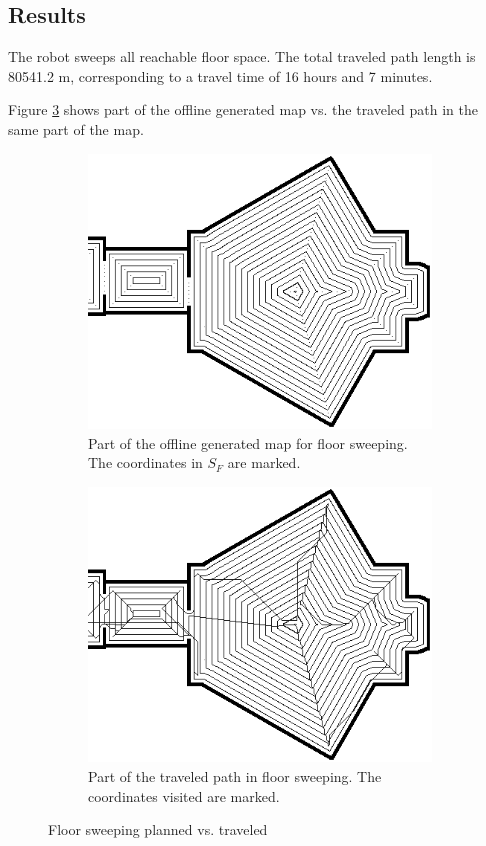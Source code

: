 \subsection{Results}
The robot sweeps all reachable floor space.
The total traveled path length is 80541.2 m, corresponding to a travel time of 16 hours and 7 minutes.

Figure \ref{floor_sweeping_results} shows part of the offline generated map vs. the traveled path in the same part of the map.

\begin{figure}[ht]
\centering
  \begin{subfigure}[t]{0.3\textwidth}
    \includegraphics[width = \textwidth]{graphics/floor_sweep_plan}
    \caption{Part of the offline generated map for floor sweeping. The coordinates in \(S_{F}\) are marked.}
    \label{floor_sweep_plan}
  \end{subfigure}
  \begin{subfigure}[t]{0.3\textwidth}
    \includegraphics[width = \textwidth]{graphics/floor_sweep_robot}
    \caption{Part of the traveled path in floor sweeping. The coordinates visited are marked.}
    \label{floor_sweep_robot}
  \end{subfigure}
\caption{Floor sweeping planned vs. traveled}
\label{floor_sweeping_results}
\end{figure}